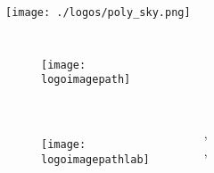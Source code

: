 {

    \begin{specialframe}
        \begin{center}
            \texttt{[image: ./logos/poly\_sky.png]}
        \end{center}

        \vspace{-0.8cm}

        \begin{block}{}
            \begin{columns}
                    \begin{minipage}[t][.2\textheight][c]{\linewidth}
                    \begin{figure}
                        \flushleft
                        \texttt{[image: \\logoimagepath]}
                    \end{figure}
                    \end{minipage}    
                    \begin{minipage}[c][.2\textheight][c]{\linewidth}
                        \centering
                        {\Large \textcolor{polyred}{\textbf{\scshape{\slidesettitle}}}}
                    \end{minipage}
                \end{columns}

                \vspace{-0.6cm}

                \begin{columns}
                    \begin{figure}
                        \flushleft
                        \texttt{[image: \\logoimagepathlab]}
                    \end{figure}
                        \begin{columns}
                                \flushleft
                                \normalsize{\textbf{\authorname}}, \coauthors \\
                                {\small \authoraffiliation, \institution}\\
                                {\footnotesize \authoremail}
                                \begin{minipage}[b][.2\textheight][b]{\linewidth}
                                    \flushright
                                    {\footnotesize \textcolor{gray}{\insertdate}}
                                \end{minipage}
                        \end{columns}     
                \end{columns}
        \end{block}
    \end{specialframe}
}

